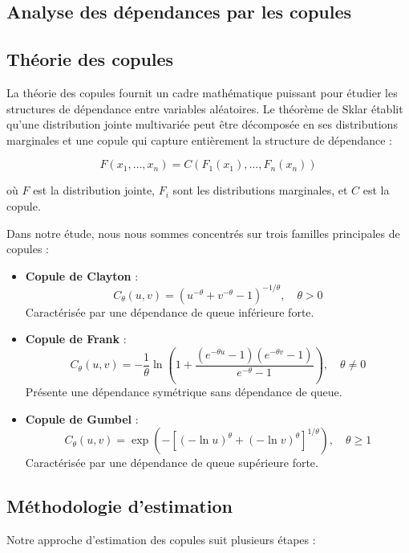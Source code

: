 \documentclass[10pt,a4paper]{article}
\theoremstyle{definition}
\theoremstyle{remark}
\begin{document}
\begin{itemize}
\newpage
\section{Analyse des dépendances par les copules}

\subsection{Théorie des copules}

La théorie des copules fournit un cadre mathématique puissant pour étudier les structures de dépendance entre variables aléatoires. Le théorème de Sklar établit qu'une distribution jointe multivariée peut être décomposée en ses distributions marginales et une copule qui capture entièrement la structure de dépendance :

\begin{equation}
F(x_1, \ldots, x_n) = C(F_1(x_1), \ldots, F_n(x_n))
\end{equation}

où $F$ est la distribution jointe, $F_i$ sont les distributions marginales, et $C$ est la copule.

Dans notre étude, nous nous sommes concentrés sur trois familles principales de copules :

\begin{itemize}
    \item \textbf{Copule de Clayton} :
    \[C_\theta(u,v) = (u^{-\theta} + v^{-\theta} - 1)^{-1/\theta}, \quad \theta > 0\]
    Caractérisée par une dépendance de queue inférieure forte.
    
    \item \textbf{Copule de Frank} :
    \[C_\theta(u,v) = -\frac{1}{\theta}\ln\left(1 + \frac{(e^{-\theta u}-1)(e^{-\theta v}-1)}{e^{-\theta}-1}\right), \quad \theta \neq 0\]
    Présente une dépendance symétrique sans dépendance de queue.
    
    \item \textbf{Copule de Gumbel} :
    \[C_\theta(u,v) = \exp\left(-\left[(-\ln u)^\theta + (-\ln v)^\theta\right]^{1/\theta}\right), \quad \theta \geq 1\]
    Caractérisée par une dépendance de queue supérieure forte.
\end{itemize}

\subsection{Méthodologie d'estimation}

Notre approche d'estimation des copules suit plusieurs étapes :


\end{itemize}
\end{document}
